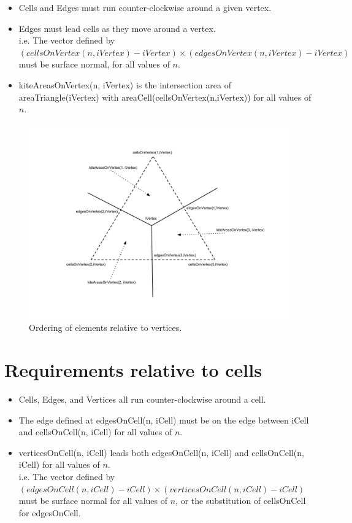 \documentclass[11pt]{report}
\begin{document}
\begin{itemize}
	\item Cells and Edges must run counter-clockwise around a given vertex.
	\item Edges must lead cells as they move around a vertex. \\
		  i.e. The vector defined by  \\
		  {\small $(cellsOnVertex(n, iVertex) - iVertex) \times (edgesOnVertex(n, iVertex) - iVertex)$} \\
		  must be surface normal, for all values of $n$.
	\item kiteAreasOnVertex(n, iVertex) is the intersection area of areaTriangle(iVertex) with areaCell(cellsOnVertex(n,iVertex)) for all values of $n$.
\end{itemize}

\begin{figure}[htp!]
	\centering
	\includegraphics[scale=0.4]{figures/VertexDiagram.pdf}
	\caption{Ordering of elements relative to vertices.}
\end{figure}

\section{Requirements relative to cells}

\begin{itemize}
	\item Cells, Edges, and Vertices all run counter-clockwise around a cell.
	\item The edge defined at edgesOnCell(n, iCell) must be on the edge between iCell and cellsOnCell(n, iCell) for all values of $n$.
	\item verticesOnCell(n, iCell) leads both edgesOnCell(n, iCell) and cellsOnCell(n, iCell) for all values of $n$. \\
		  i.e. The vector defined by \\
		  {\small $(edgesOnCell(n, iCell) - iCell) \times (verticesOnCell(n, iCell) - iCell)$} \\
		  must be surface normal for all values of $n$, or the substitution of cellsOnCell for edgesOnCell.
\end{itemize}
\end{document}
